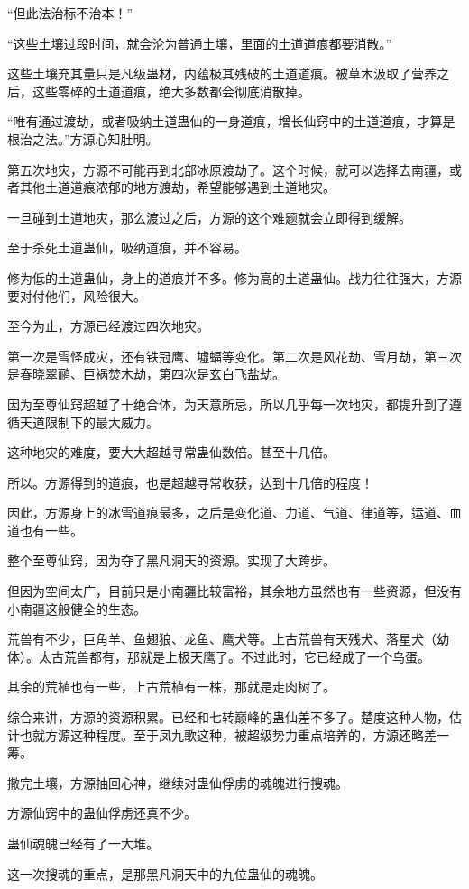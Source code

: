 \begin{this_body}
“但此法治标不治本！”

“这些土壤过段时间，就会沦为普通土壤，里面的土道道痕都要消散。”

这些土壤充其量只是凡级蛊材，内蕴极其残破的土道道痕。被草木汲取了营养之后，这些零碎的土道道痕，绝大多数都会彻底消散掉。

“唯有通过渡劫，或者吸纳土道蛊仙的一身道痕，增长仙窍中的土道道痕，才算是根治之法。”方源心知肚明。

第五次地灾，方源不可能再到北部冰原渡劫了。这个时候，就可以选择去南疆，或者其他土道道痕浓郁的地方渡劫，希望能够遇到土道地灾。

一旦碰到土道地灾，那么渡过之后，方源的这个难题就会立即得到缓解。

至于杀死土道蛊仙，吸纳道痕，并不容易。

修为低的土道蛊仙，身上的道痕并不多。修为高的土道蛊仙。战力往往强大，方源要对付他们，风险很大。

至今为止，方源已经渡过四次地灾。

第一次是雪怪成灾，还有铁冠鹰、墟蝠等变化。第二次是风花劫、雪月劫，第三次是春晓翠鹂、巨祸焚木劫，第四次是玄白飞盐劫。

因为至尊仙窍超越了十绝合体，为天意所忌，所以几乎每一次地灾，都提升到了遵循天道限制下的最大威力。

这种地灾的难度，要大大超越寻常蛊仙数倍。甚至十几倍。

所以。方源得到的道痕，也是超越寻常收获，达到十几倍的程度！

因此，方源身上的冰雪道痕最多，之后是变化道、力道、气道、律道等，运道、血道也有一些。

整个至尊仙窍，因为夺了黑凡洞天的资源。实现了大跨步。

但因为空间太广，目前只是小南疆比较富裕，其余地方虽然也有一些资源，但没有小南疆这般健全的生态。

荒兽有不少，巨角羊、鱼翅狼、龙鱼、鹰犬等。上古荒兽有天残犬、落星犬（幼体）。太古荒兽都有，那就是上极天鹰了。不过此时，它已经成了一个鸟蛋。

其余的荒植也有一些，上古荒植有一株，那就是走肉树了。

综合来讲，方源的资源积累。已经和七转巅峰的蛊仙差不多了。楚度这种人物，估计也就方源这种程度。至于凤九歌这种，被超级势力重点培养的，方源还略差一筹。

撒完土壤，方源抽回心神，继续对蛊仙俘虏的魂魄进行搜魂。

方源仙窍中的蛊仙俘虏还真不少。

蛊仙魂魄已经有了一大堆。

这一次搜魂的重点，是那黑凡洞天中的九位蛊仙的魂魄。


\end{this_body}
